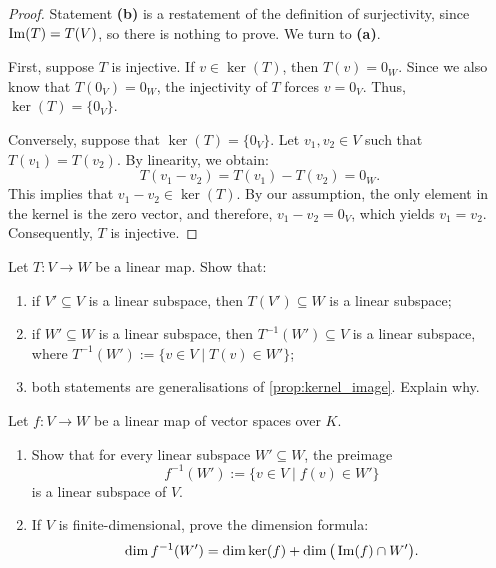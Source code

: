 \begin{proof}
Statement \textbf{(b)} is a restatement of the definition of surjectivity, since $\operatorname{Im}(T) = T(V)$, so there is nothing to prove. We turn to \textbf{(a)}.

First, suppose $T$ is injective. If $v \in \ker(T)$, then $T(v) = 0_W$. Since we also know that $T(0_V) = 0_W$, the injectivity of $T$ forces $v = 0_V$. Thus, $\ker(T) = \{0_V\}$.

Conversely, suppose that $\ker(T) = \{0_V\}$. Let $v_1, v_2 \in V$ such that $T(v_1) = T(v_2)$. By linearity, we obtain:
\[
T(v_1 - v_2) = T(v_1) - T(v_2) = 0_W.
\]
This implies that $v_1 - v_2 \in \ker(T)$. By our assumption, the only element in the kernel is the zero vector, and therefore, $v_1 - v_2 = 0_V$, which yields $v_1 = v_2$. Consequently, $T$ is injective.
\end{proof}

\begin{exercise}
\label{exc:images_preimages_subspaces}
Let $T: V \to W$ be a linear map. Show that:
\begin{enumerate}[label=\textbf{(\alph*)}]
    \item if $V' \subseteq V$ is a linear subspace, then $T(V') \subseteq W$ is a linear subspace;
    \item if $W' \subseteq W$ is a linear subspace, then $T^{-1}(W') \subseteq V$ is a linear subspace, where $T^{-1}(W') := \{v \in V \mid T(v) \in W'\}$;
    \item both statements are generalisations of \cref{prop:kernel_image}. Explain why.
\end{enumerate}
\end{exercise}

\begin{exercise}
\label{exc:preimage_subspace_dimension_formula}
Let $f \colon V \to W$ be a linear map of vector spaces over $K$.
\begin{enumerate}
    \item Show that for every linear subspace $W' \subseteq W$, the preimage
    \[
    f^{-1}(W') := \{v \in V \mid f(v) \in W'\}
    \]
    is a linear subspace of $V$.
    \item If $V$ is finite-dimensional, prove the dimension formula:
    \[
    \dim f^{-1}(W') = \dim \ker(f) + \dim\big(\operatorname{Im}(f) \cap W'\big).
    \]
\end{enumerate}
\end{exercise}

